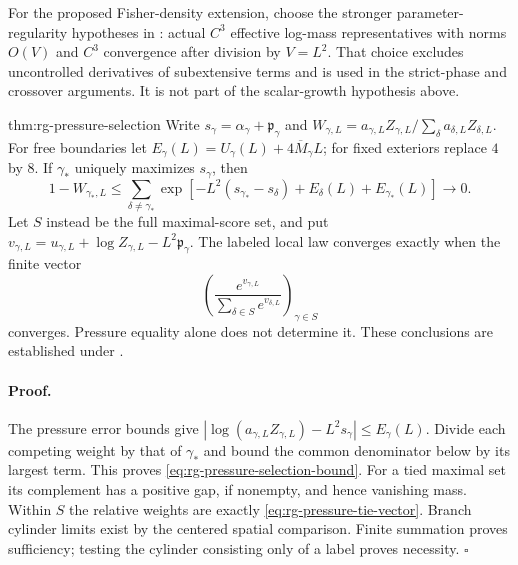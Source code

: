 For the proposed Fisher-density extension, choose the stronger
parameter-regularity hypotheses in
: actual $C^3$ effective
log-mass representatives with norms $O(V)$ and $C^3$ convergence after
division by $V=L^2$. That choice excludes uncontrolled derivatives of
subextensive terms and is used in the strict-phase and crossover
arguments. It is not part of the scalar-growth hypothesis above.

{thm:rg-pressure-selection}
Write $s_\gamma=\alpha_\gamma+\mathfrak p_\gamma$ and
$W_{\gamma,L}=a_{\gamma,L}Z_{\gamma,L}/\sum_\delta a_{\delta,L}Z_{\delta,L}$.
For free boundaries let
$E_\gamma(L)=U_\gamma(L)+4\overline M_\gamma L$; for fixed exteriors
replace $4$ by $8$. If $\gamma_*$ uniquely maximizes $s_\gamma$, then
\begin{equation}
 1-W_{\gamma_*,L}\leq\sum_{\delta\ne\gamma_*}
 \exp\left[-L^2(s_{\gamma_*}-s_\delta)
                  +E_\delta(L)+E_{\gamma_*}(L)\right]\longrightarrow0.
 \label{eq:rg-pressure-selection-bound}
\end{equation}
Let $S$ instead be the full maximal-score set, and put
$v_{\gamma,L}=u_{\gamma,L}+\log Z_{\gamma,L}-L^2\mathfrak p_\gamma$.
The labeled local law converges exactly when the finite vector
\begin{equation}
 \left(\frac{e^{v_{\gamma,L}}}
 {\sum_{\delta\in S}e^{v_{\delta,L}}}\right)_{\gamma\in S}
 \label{eq:rg-pressure-tie-vector}
\end{equation}
converges. Pressure equality alone does not determine it.
These conclusions are established under
. 

\paragraph{Proof.}
The pressure error bounds give
$|\log(a_{\gamma,L}Z_{\gamma,L})-L^2s_\gamma|\leq E_\gamma(L)$.
Divide each competing weight by that of $\gamma_*$ and bound the common
denominator below by its largest term. This proves
\cref{eq:rg-pressure-selection-bound}. For a tied maximal set its
complement has a positive gap, if nonempty, and hence vanishing mass.
Within $S$ the relative weights are exactly
\cref{eq:rg-pressure-tie-vector}. Branch cylinder limits exist by the
centered spatial comparison. Finite summation proves sufficiency; testing
the cylinder consisting only of a label proves necessity.
$\square$

